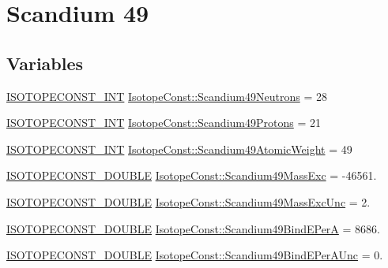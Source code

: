 \hypertarget{group___isotope_const-_scandium-_sc49}{}\section{Scandium 49}
\label{group___isotope_const-_scandium-_sc49}
\subsection*{Variables}
\begin{DoxyCompactItemize}
\item 
\mbox{\hyperlink{group___isotope_const-_macros_ga5f18360b3e99483a35c32d789e62621c}{I\+S\+O\+T\+O\+P\+E\+C\+O\+N\+S\+T\+\_\+\+I\+NT}} \mbox{\hyperlink{group___isotope_const-_scandium-_sc49_ga91f59d5f836e9386fffe26ec5269d71a}{Isotope\+Const\+::\+Scandium49\+Neutrons}} = 28
\item 
\mbox{\hyperlink{group___isotope_const-_macros_ga5f18360b3e99483a35c32d789e62621c}{I\+S\+O\+T\+O\+P\+E\+C\+O\+N\+S\+T\+\_\+\+I\+NT}} \mbox{\hyperlink{group___isotope_const-_scandium-_sc49_gae1c5b3ac51caa324ae8fcacc2a49ecab}{Isotope\+Const\+::\+Scandium49\+Protons}} = 21
\item 
\mbox{\hyperlink{group___isotope_const-_macros_ga5f18360b3e99483a35c32d789e62621c}{I\+S\+O\+T\+O\+P\+E\+C\+O\+N\+S\+T\+\_\+\+I\+NT}} \mbox{\hyperlink{group___isotope_const-_scandium-_sc49_ga8bf52f264a997aa47590ab16a2a3a164}{Isotope\+Const\+::\+Scandium49\+Atomic\+Weight}} = 49
\item 
\mbox{\hyperlink{group___isotope_const-_macros_ga8f45a7272ce02c0b4c65c44636ed719a}{I\+S\+O\+T\+O\+P\+E\+C\+O\+N\+S\+T\+\_\+\+D\+O\+U\+B\+LE}} \mbox{\hyperlink{group___isotope_const-_scandium-_sc49_gae6ccacdd45baa4c65ed9e46d486f5321}{Isotope\+Const\+::\+Scandium49\+Mass\+Exc}} = -\/46561.
\item 
\mbox{\hyperlink{group___isotope_const-_macros_ga8f45a7272ce02c0b4c65c44636ed719a}{I\+S\+O\+T\+O\+P\+E\+C\+O\+N\+S\+T\+\_\+\+D\+O\+U\+B\+LE}} \mbox{\hyperlink{group___isotope_const-_scandium-_sc49_ga74ba4e9d1042eda2f397004f1e16e608}{Isotope\+Const\+::\+Scandium49\+Mass\+Exc\+Unc}} = 2.
\item 
\mbox{\hyperlink{group___isotope_const-_macros_ga8f45a7272ce02c0b4c65c44636ed719a}{I\+S\+O\+T\+O\+P\+E\+C\+O\+N\+S\+T\+\_\+\+D\+O\+U\+B\+LE}} \mbox{\hyperlink{group___isotope_const-_scandium-_sc49_gacca85e9738717c0467cbf2c0bd38a7e6}{Isotope\+Const\+::\+Scandium49\+Bind\+E\+PerA}} = 8686.
\item 
\mbox{\hyperlink{group___isotope_const-_macros_ga8f45a7272ce02c0b4c65c44636ed719a}{I\+S\+O\+T\+O\+P\+E\+C\+O\+N\+S\+T\+\_\+\+D\+O\+U\+B\+LE}} \mbox{\hyperlink{group___isotope_const-_scandium-_sc49_ga516ac73a8d90370b9e2b6f1ea7ab4f7e}{Isotope\+Const\+::\+Scandium49\+Bind\+E\+Per\+A\+Unc}} = 0.

\end{DoxyCompactItemize}
